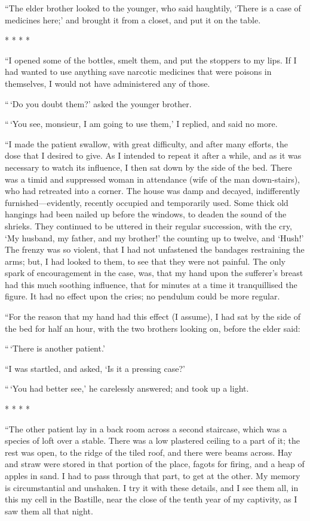 ``The elder brother looked to the younger, who said haughtily, `There
is a case of medicines here;' and brought it from a closet, and put
it on the table.

* * * *

``I opened some of the bottles, smelt them, and put the stoppers to my
lips.  If I had wanted to use anything save narcotic medicines that
were poisons in themselves, I would not have administered any of those.

``\,`Do you doubt them?' asked the younger brother.

``\,`You see, monsieur, I am going to use them,' I replied, and said no
more.

``I made the patient swallow, with great difficulty, and after many
efforts, the dose that I desired to give.  As I intended to repeat it
after a while, and as it was necessary to watch its influence, I then
sat down by the side of the bed.  There was a timid and suppressed
woman in attendance (wife of the man down-stairs), who had retreated
into a corner. The house was damp and decayed, indifferently
furnished---evidently, recently occupied and temporarily used.
Some thick old hangings had been nailed up before the windows, to
deaden the sound of the shrieks.  They continued to be uttered in
their regular succession, with the cry, `My husband, my father, and
my brother!'  the counting up to twelve, and `Hush!' The frenzy was
so violent, that I had not unfastened the bandages restraining the
arms; but, I had looked to them, to see that they were not painful.
The only spark of encouragement in the case, was, that my hand upon
the sufferer's breast had this much soothing influence, that for
minutes at a time it tranquillised the figure.  It had no effect upon
the cries; no pendulum could be more regular.

``For the reason that my hand had this effect (I assume), I had sat by
the side of the bed for half an hour, with the two brothers looking
on, before the elder said:

``\,`There is another patient.'

``I was startled, and asked, `Is it a pressing case?'

``\,`You had better see,' he carelessly answered; and took up a light.

* * * *

``The other patient lay in a back room across a second staircase,
which was a species of loft over a stable.  There was a low plastered
ceiling to a part of it; the rest was open, to the ridge of the tiled
roof, and there were beams across.  Hay and straw were stored in that
portion of the place, fagots for firing, and a heap of apples in sand.
I had to pass through that part, to get at the other.  My memory is
circumstantial and unshaken.  I try it with these details, and I see
them all, in this my cell in the Bastille, near the close of the
tenth year of my captivity, as I saw them all that night.


